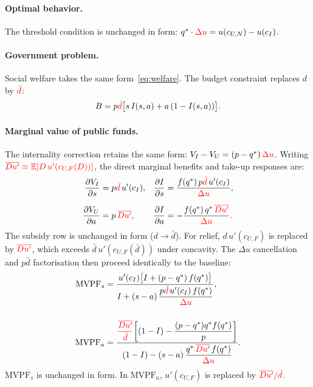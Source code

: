 \documentclass[12pt]{article}
\begin{document}
\paragraph{Optimal behavior.}
The threshold condition is unchanged in form: $q^*\cdot\textcolor{red}{\Delta u}=u(c_{U,N})-u(c_I)$.

\paragraph{Government problem.}
Social welfare takes the same form~\eqref{eq:welfare}. The budget constraint replaces $d$ by $\textcolor{red}{\bar{d}}$:
\[
    B=p\textcolor{red}{\bar{d}}\bigl[s\,I(s,a)+a\,(1-I(s,a))\bigr].
\]

\paragraph{Marginal value of public funds.}
The internality correction retains the same form: $V_I-V_U=(p-q^*)\,\textcolor{red}{\Delta u}$. Writing $\textcolor{red}{\overline{Du'}\equiv\mathbb{E}[D\,u'(c_{U,F}(D))]}$, the direct marginal benefits and take-up responses are:
\begin{align}
    \frac{\partial V_I}{\partial s} &= p\textcolor{red}{\bar{d}}\,u'(c_I),
    &\frac{\partial I}{\partial s} &= \frac{f(q^*)\,p\textcolor{red}{\bar{d}}\,u'(c_I)}{\textcolor{red}{\Delta u}}, \label{eq:dI_s_cont}\\[6pt]
    \frac{\partial V_U}{\partial a} &= p\,\textcolor{red}{\overline{Du'}},
    &\frac{\partial I}{\partial a} &= -\frac{f(q^*)\,q^*\,\textcolor{red}{\overline{Du'}}}{\textcolor{red}{\Delta u}}. \label{eq:dI_a_cont}
\end{align}
The subsidy row is unchanged in form ($d\to\bar{d}$). For relief, $d\,u'(c_{U,F})$ is replaced by $\textcolor{red}{\overline{Du'}}$, which exceeds $\bar{d}\,u'(c_{U,F}(\bar{d}))$ under concavity. The $\Delta u$ cancellation and $p\bar{d}$ factorisation then proceed identically to the baseline:
\begin{align}
    \text{MVPF}_s &= \frac{u'(c_I)\bigl[I + (p-q^*)\,f(q^*)\bigr]}{I + (s-a)\,\dfrac{p\textcolor{red}{\bar{d}}\,u'(c_I)\,f(q^*)}{\textcolor{red}{\Delta u}}}, \label{eq:mvpf_s_cont}\\[14pt]
    \text{MVPF}_a &= \frac{\textcolor{red}{\dfrac{\overline{Du'}}{\bar{d}}}\!\left[(1-I) - \dfrac{(p-q^*)q^*f(q^*)}{p}\right]}{(1-I) - (s-a)\,\dfrac{q^*\,\textcolor{red}{\overline{Du'}}\,f(q^*)}{\textcolor{red}{\Delta u}}}. \label{eq:mvpf_a_cont}
\end{align}
$\mathrm{MVPF}_s$ is unchanged in form. In $\mathrm{MVPF}_a$, $u'(c_{U,F})$ is replaced by $\textcolor{red}{\overline{Du'}/\bar{d}}$.
\end{document}
